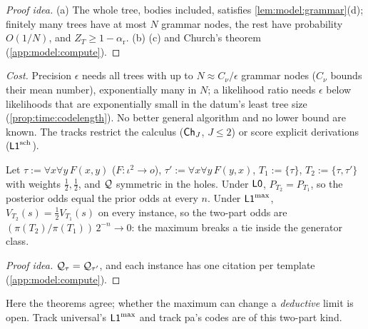 \begin{proof}[Proof idea]
(a) The whole tree, bodies included, satisfies \cref{lem:model:grammar}(d); finitely many trees have at most $N$ grammar nodes, the rest have probability $O(1/N)$, and $Z_T\ge1-\alpha_{\mathrm r}$. (b) (c) and Church's theorem (\cref{app:model:compute}).
\end{proof}

\emph{Cost.} Precision $\epsilon$ needs all trees with up to $N\approx C_\nu/\epsilon$ grammar nodes ($C_\nu$ bounds their mean number), exponentially many in $N$; a likelihood ratio needs $\epsilon$ below likelihoods that are exponentially small in the datum's least tree size (\cref{prop:time:codelength}). No better general algorithm and no lower bound are known. The tracks restrict the calculus ($\mathsf{Ch}_{J}$, $J\le2$) or score explicit derivations ($\mathord{\mathsf{L1}}^{\mathrm{sch}}$).

\begin{proposition}\label{prop:model:max}
Let $\tau:=\forall x\forall y\,F(x,y)$ ($F:\iota^2\to o$), $\tau':=\forall x\forall y\,F(y,x)$, $T_1:=\{\tau\}$, $T_2:=\{\tau,\tau'\}$ with weights $\tfrac12,\tfrac12$, and $\mathcal{Q}$ symmetric in the holes. Under $\mathord{\mathsf{L0}}$, $P_{T_2}=P_{T_1}$, so the posterior odds equal the prior odds at every $n$. Under $\mathord{\mathsf{L1}}^{\max}$, $V_{T_2}(s)=\tfrac12V_{T_1}(s)$ on every instance, so the two-part odds are $(\pi(T_2)/\pi(T_1))\,2^{-n}\to0$: the maximum breaks a tie inside the generator class.
\end{proposition}

\begin{proof}[Proof idea]
$\mathcal{Q}_\tau=\mathcal{Q}_{\tau'}$, and each instance has one citation per template (\cref{app:model:compute}).
\end{proof}

Here the theorems agree; whether the maximum can change a \emph{deductive} limit is open. Track universal's $\mathord{\mathsf{L1}}^{\max}$ and track pa's codes are of this two-part kind.
